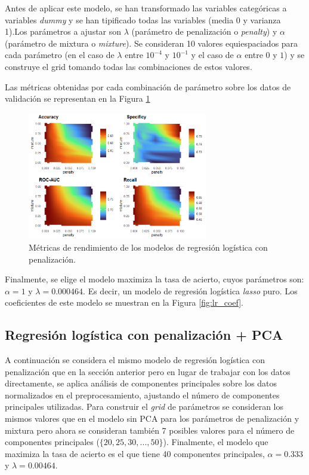 \documentclass[12pt,a4paper,]{book}
\newcounter{dummy}
\numberwithin{dummy}{section}
\theoremstyle{ocrenumbox}
\theoremstyle{blacknumex}
\theoremstyle{blacknumbox}
\theoremstyle{ocrenum}
\theoremstyle{ocrenum}
\begin{document}
Antes de aplicar este modelo, se han transformado las variables
categóricas a variables \emph{dummy} y se han tipificado todas las
variables (media 0 y varianza 1).Los parámetros a ajustar son
\(\lambda\) (parámetro de penalización o \emph{penalty}) y \(\alpha\)
(parámetro de mixtura o \emph{mixture}). Se consideran 10 valores
equiespaciados para cada parámetro (en el caso de \(\lambda\) entre
\(10^{-4}\) y \(10^{-1}\) y el caso de \(\alpha\) entre \(0\) y \(1\)) y
se construye el grid tomando todas las combinaciones de estos valores.

Las métricas obtenidas por cada combinación de parámetro sobre los datos
de validación se representan en la Figura \ref{fig:lr_tuningplot}

\begin{figure}[h!]
\centering
\includegraphics[width =0.7\textwidth]{graficos/lr_tuningplot.png}
\caption{Métricas de rendimiento de los modelos de regresión logística con penalización.}
\label{fig:lr_tuningplot}
\end{figure}

Finalmente, se elige el modelo maximiza la tasa de acierto, cuyos
parámetros son: \(\alpha= 1\) y \(\lambda = 0.000464\). Es decir, un
modelo de regresión logística \emph{lasso} puro. Los coeficientes de
este modelo se muestran en la Figura \ref{fig:lr_coef}.

\hypertarget{regresiuxf3n-loguxedstica-con-penalizaciuxf3n-pca}{%
\subsection{Regresión logística con penalización +
PCA}\label{regresiuxf3n-loguxedstica-con-penalizaciuxf3n-pca}}

A continuación se considera el mismo modelo de regresión logística con
penalización que en la sección anterior pero en lugar de trabajar con
los datos directamente, se aplica análisis de componentes principales
sobre los datos normalizados en el preprocesamiento, ajustando el número
de componentes principales utilizadas. Para construir el \emph{grid} de
parámetros se consideran los mismos valores que en el modelo sin PCA
para los parámetros de penalización y mixtura pero ahora se consideran
también 7 posibles valores para el número de componentes principales
(\(\{20,25,30,...,50\}\)). Finalmente, el modelo que maximiza la tasa de
acierto es el que tiene 40 componentes principales, \(\alpha= 0.333\) y
\(\lambda = 0.00464\).
\end{document}
